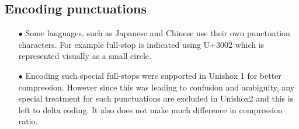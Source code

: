 \documentclass[]{article}
\begin{document}
\subsection{Encoding punctuations}
\begin{itemize}
	\item[$\bullet$] Some languages, such as Japanese and Chinese use their own punctuation characters.  For example full-stop is indicated using U+3002 which is represented visually as a small circle.
	\item[$\bullet$] Encoding such special full-stops were supported in Unishox 1 for better compression.  However since this was leading to confusion and ambiguity, any special treatment for such punctuations are excluded in Unishox2 and this is left to delta coding. It also does not make much difference in compression ratio.
\end{itemize}
\end{document}
